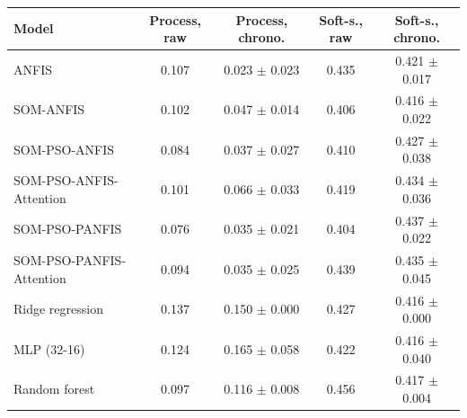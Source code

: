 \begin{tabular}{lcccc}
\hline
Model & Process, raw & Process, chrono. & Soft-s., raw & Soft-s., chrono. \\
\hline
ANFIS & 0.107 & 0.023 $\pm$ 0.023 & 0.435 & 0.421 $\pm$ 0.017 \\
SOM-ANFIS & 0.102 & 0.047 $\pm$ 0.014 & 0.406 & 0.416 $\pm$ 0.022 \\
SOM-PSO-ANFIS & 0.084 & 0.037 $\pm$ 0.027 & 0.410 & 0.427 $\pm$ 0.038 \\
SOM-PSO-ANFIS-Attention & 0.101 & 0.066 $\pm$ 0.033 & 0.419 & 0.434 $\pm$ 0.036 \\
SOM-PSO-PANFIS & 0.076 & 0.035 $\pm$ 0.021 & 0.404 & 0.437 $\pm$ 0.022 \\
SOM-PSO-PANFIS-Attention & 0.094 & 0.035 $\pm$ 0.025 & 0.439 & 0.435 $\pm$ 0.045 \\
\hline
Ridge regression & 0.137 & 0.150 $\pm$ 0.000 & 0.427 & 0.416 $\pm$ 0.000 \\
MLP (32-16) & 0.124 & 0.165 $\pm$ 0.058 & 0.422 & 0.416 $\pm$ 0.040 \\
Random forest & 0.097 & 0.116 $\pm$ 0.008 & 0.456 & 0.417 $\pm$ 0.004 \\
\hline
\end{tabular}
